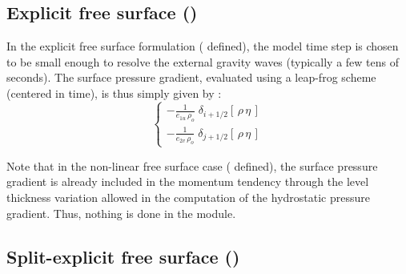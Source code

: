 \documentclass[../main/NEMO_manual]{subfiles}
\begin{document}
\subsection{Explicit free surface (\protect{})}
\label{subsec:DYN_spg_exp}

In the explicit free surface formulation ( defined),
the model time step is chosen to be small enough to resolve the external gravity waves
(typically a few tens of seconds).
The surface pressure gradient, evaluated using a leap-frog scheme (\ie centered in time),
is thus simply given by :
\begin{equation}
  \label{eq:dynspg_exp}
  \left\{
    \begin{aligned}
      - \frac{1}{e_{1u}\,\rho_o} \;	\delta_{i+1/2} \left[  \,\rho \,\eta\,  \right] 	\\
      - \frac{1}{e_{2v}\,\rho_o} \;	\delta_{j+1/2} \left[  \,\rho \,\eta\,  \right]
    \end{aligned}
  \right.
\end{equation} 

Note that in the non-linear free surface case (\ie {} defined),
the surface pressure gradient is already included in the momentum tendency through
the level thickness variation allowed in the computation of the hydrostatic pressure gradient.
Thus, nothing is done in the  module.

\subsection{Split-explicit free surface (\protect{})}
\label{subsec:DYN_spg_ts}
%
\end{document}
